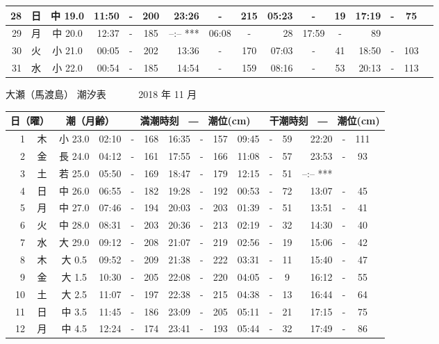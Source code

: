 \documentclass[12pt.a4j]{jsarticle}
\begin{document}
\begin{center}
\begin{table}[ht]
\begin{tabular}{|rc|cr|ccrccr|ccrccr|}
\hline
28 & 日 & 中 19.0 & 11:50 &-& 200 & 23:26 &-& 215 & 05:23 &-&  19 & 17:19 &-&  75 \\
\hline
29 & 月 & 中 20.0 & 12:37 &-& 185 & --:--   *** & 06:08 &-&  28 & 17:59 &-&  89 \\
\hline
30 & 火 & 小 21.0 & 00:05 &-& 202 & 13:36 &-& 170 & 07:03 &-&  41 & 18:50 &-& 103 \\
\hline
31 & 水 & 小 22.0 & 00:54 &-& 185 & 14:54 &-& 159 & 08:16 &-&  53 & 20:13 &-& 113 \\
\hline
\end{tabular}
\end{table}
\newpage
 {\LARGE 大瀬（馬渡島）  潮汐表　　　}
 {\large 2018 年 11 月}\\
 \begin{table}[ht]
 \begin{tabular}{|rc|cr|ccrccr|ccrccr|}
 \hline
 \multicolumn{2}{|c|}{日（曜）} & \multicolumn{2}{c|}{潮（月齢）} & \multicolumn{6}{c|}{満潮時刻　―　潮位(cm)} & \multicolumn{6}{c|}{干潮時刻　―　潮位(cm)} \\
 \hline
 1 & 木 & 小 23.0 & 02:10 &-& 168 & 16:35 &-& 157 & 09:45 &-&  59 & 22:20 &-& 111 \\
\hline
 2 & 金 & 長 24.0 & 04:12 &-& 161 & 17:55 &-& 166 & 11:08 &-&  57 & 23:53 &-&  93 \\
\hline
 3 & 土 & 若 25.0 & 05:50 &-& 169 & 18:47 &-& 179 & 12:15 &-&  51 & --:--   *** \\
\hline
 4 & 日 & 中 26.0 & 06:55 &-& 182 & 19:28 &-& 192 & 00:53 &-&  72 & 13:07 &-&  45 \\
\hline
 5 & 月 & 中 27.0 & 07:46 &-& 194 & 20:03 &-& 203 & 01:39 &-&  51 & 13:51 &-&  41 \\
\hline
 6 & 火 & 中 28.0 & 08:31 &-& 203 & 20:36 &-& 213 & 02:19 &-&  32 & 14:30 &-&  40 \\
\hline
 7 & 水 & 大 29.0 & 09:12 &-& 208 & 21:07 &-& 219 & 02:56 &-&  19 & 15:06 &-&  42 \\
\hline
 8 & 木 & 大  0.5 & 09:52 &-& 209 & 21:38 &-& 222 & 03:31 &-&  11 & 15:40 &-&  47 \\
\hline
 9 & 金 & 大  1.5 & 10:30 &-& 205 & 22:08 &-& 220 & 04:05 &-&   9 & 16:12 &-&  55 \\
\hline
10 & 土 & 大  2.5 & 11:07 &-& 197 & 22:38 &-& 215 & 04:38 &-&  13 & 16:44 &-&  64 \\
\hline
11 & 日 & 中  3.5 & 11:45 &-& 186 & 23:09 &-& 205 & 05:11 &-&  21 & 17:15 &-&  75 \\
\hline
12 & 月 & 中  4.5 & 12:24 &-& 174 & 23:41 &-& 193 & 05:44 &-&  32 & 17:49 &-&  86 \\

\end{tabular}
\end{table}
\end{center}
\end{document}
